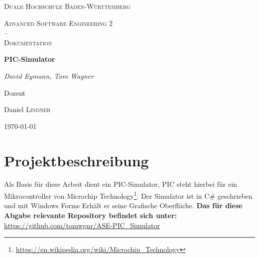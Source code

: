 \documentclass[12pt,a4paper,titlepage,ngerman,pdftex]{report}
\begin{document}
    \begin{titlepage}
        \centering
        {\scshape\LARGE Duale Hochschule Baden-Württemberg \par}
        \vspace{1cm}
        {\scshape\Large Advanced Software Engineering 2 \\--\\ Dokumentation\par}
        \vspace{1.5cm}
        {\huge\bfseries PIC-Simulator\par}
        \vspace{2cm}
        {\Large\itshape David Eymann, Tom Wagner\par}
        \vfill
        Dozent\par
        Daniel \textsc{Lindner}

        \vfill

        {\large \today\par}
    \end{titlepage}

    \tableofcontents
    \listoffigures
    \lstlistoflistings

    \onehalfspacing

    \chapter{Projektbeschreibung}\label{ch:projektbeschreibung}

    Als Basis für diese Arbeit dient ein PIC-Simulator, PIC steht hierbei für ein Mikrocontroller von Microchip Technology\footnote{\url{https://en.wikipedia.org/wiki/Microchip_Technology}}.
    Der Simulator ist in C\# geschrieben und mit Windows Forms Erhält er seine Grafische Oberfläche.
    \textbf{Das für diese Abgabe relevante Repository befindet sich unter:} \\ \url{https://github.com/tomwgnr/ASE-PIC_Simulator}\\
\end{document}
